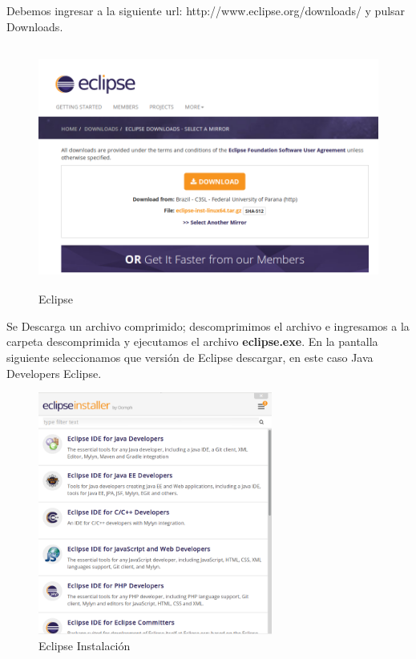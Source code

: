 Debemos ingresar a la siguiente url: http://www.eclipse.org/downloads/ y pulsar Downloads.
\begin{figure}[H]
 \centering
  \includegraphics[height=8cm,keepaspectratio=true,clip=true]{imagenes/Apendice/eclipse1.png}
  \caption{Eclipse}
\end{figure}

Se Descarga un archivo comprimido; descomprimimos el archivo e ingresamos a la carpeta descomprimida y ejecutamos el archivo 
\textbf{eclipse.exe}. En la pantalla siguiente seleccionamos que versión de Eclipse descargar, en este caso Java Developers Eclipse.

\begin{figure}[h]
 \centering
  \includegraphics[height=8cm,keepaspectratio=true,clip=true]{imagenes/Apendice/eclipse2.png}
  \caption{Eclipse Instalación}
\end{figure}

